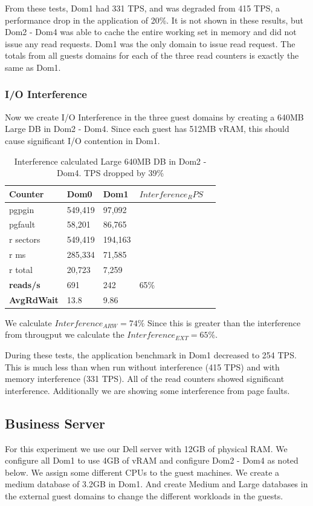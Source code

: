 From these tests, Dom1 had 331 TPS, and was degraded from 415 TPS, a performance drop in the application of 20\%.  It is not shown in these results, but Dom2 - Dom4 was able to cache the entire working set in memory and did not issue any read requests.  Dom1 was the only domain to issue read request. The totals from all guests domains for each of the three read counters is exactly the same as Dom1.  

\subsubsection{I/O Interference}
Now we create I/O Interference in the three guest domains by creating a 640MB Large DB in Dom2 - Dom4.  Since each guest has 512MB vRAM, this should cause significant I/O contention in Dom1.

\begin{table}[h]
\begin{tabular}{ l l l l p{5cm} }
  Counter     & Dom0    & Dom1    & $Interference_RPS$ \\
  \hline
	pgpgin    & 549,419 & 97,092 &  \\
	pgfault   &  58,201 & 86,765 &  \\
	r sectors & 549,419 &194,163 &  \\
	r ms      & 285,334 & 71,585 &  \\
	r total   &  20,723 &  7,259 &  \\
    \textbf{reads/s}    & 691 & 242 &   65\% \\
    \textbf{AvgRdWait}  & 13.8 & 9.86 &  \\ 
  \hline
\end{tabular}
\caption{Interference calculated Large 640MB DB in Dom2 - Dom4.  TPS dropped by 39\%}
\label{fig:InterferenceLg}
\end{table}
We calculate $Interference_{ARW} = 74\%$  Since this is greater than the interference from througput we calculate the $Interference_{EXT} = 65\%$.

During these tests, the application benchmark in Dom1 decreased to 254 TPS.  This is much less than when run without interference (415 TPS) and with memory interference (331 TPS).  All of the read counters showed significant interference.  Additionally we are showing some interference from page faults.  

\subsection{Business Server}
For this experiment we use our Dell server with 12GB of physical RAM. We configure all Dom1 to use 4GB of vRAM and configure Dom2 - Dom4 as noted below.  We assign some different CPUs to the guest machines. We create a medium database of 3.2GB in Dom1.   And create Medium and Large databases in the external guest domains to change the different workloads in the guests.


